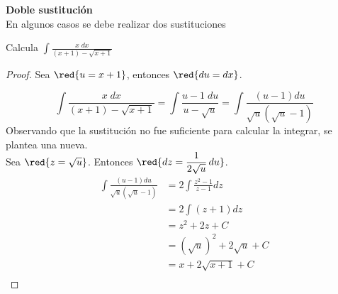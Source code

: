 

 \textcolor{red!50!black}{\Large \bf Doble sustituci\'on } \\

En algunos casos se debe realizar dos sustituciones

\begin{Ejemplo}\label{eje212} Calcula $\displaystyle\int\frac{x\;dx}{(x+1)-\sqrt{x+1}}$  \end{Ejemplo}
 \begin{proof}

Sea $\red{u=x+1}$, entonces  $\red{du=dx}$.

$$\displaystyle\int\frac{x\;dx}{(x+1)-\sqrt{x+1}}=\displaystyle\int\frac{u-1\;du}{u-\sqrt{u}}=\int\frac{(u-1)du}{\sqrt{u}(\sqrt{u}-1)}$$
Observando que la sustituci\'on no fue suficiente para calcular la integrar, se plantea una nueva. \\

Sea $\red{z=\sqrt{u}}$. Entonces  $\red{dz=\dfrac{1}{2\sqrt{u}}\,du}$.
\begin{align*}
\displaystyle\int\frac{(u-1)du}{\sqrt{u}(\sqrt{u}-1)}&=2\displaystyle\int \frac{z^2-1}{z-1}dz \\
&= 2\displaystyle\int ( z +1 ) dz \\
&= z^2+2z+C \\
&=(\sqrt{u})^2+2\sqrt{u}+C \\
&=x+2\sqrt{x+1}+C \\
\end{align*}
\end{proof}





%
%
%
%
% 
%

